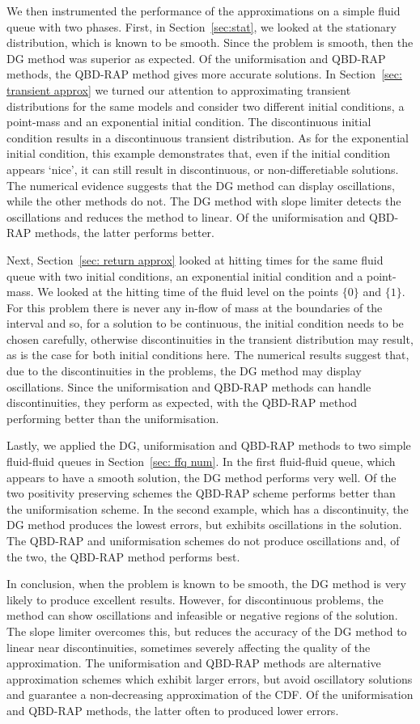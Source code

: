 We then instrumented the performance of the approximations on a simple fluid queue with two phases. First, in Section~\ref{sec:stat}, we looked at the stationary distribution, which is known to be smooth. Since the problem is smooth, then the DG method was superior as expected. Of the uniformisation and QBD-RAP methods, the QBD-RAP method gives more accurate solutions. In Section~\ref{sec: transient approx} we turned our attention to approximating transient distributions for the same models and consider two different initial conditions, a point-mass and an exponential initial condition. The discontinuous initial condition results in a discontinuous transient distribution. As for the exponential initial condition, this example demonstrates that, even if the initial condition appears `nice', it can still result in discontinuous, or non-differetiable solutions. The numerical evidence suggests that the DG method can display oscillations, while the other methods do not. The DG method with slope limiter detects the oscillations and reduces the method to linear. Of the uniformisation and QBD-RAP methods, the latter performs better. 

Next, Section~\ref{sec: return approx} looked at hitting times for the same fluid queue with two initial conditions, an exponential initial condition and a point-mass. We looked at the hitting time of the fluid level on the points \(\{0\}\) and \(\{1\}\). For this problem there is never any in-flow of mass at the boundaries of the interval and so, for a solution to be continuous, the initial condition needs to be chosen carefully, otherwise discontinuities in the transient distribution may result, as is the case for both initial conditions here. The numerical results suggest that, due to the discontinuities in the problems, the DG method may display oscillations. Since the uniformisation and QBD-RAP methods can handle discontinuities, they perform as expected, with the QBD-RAP method performing better than the uniformisation. 

Lastly, we applied the DG, uniformisation and QBD-RAP methods to two simple fluid-fluid queues in Section~\ref{sec: ffq num}. In the first fluid-fluid queue, which appears to have a smooth solution, the DG method performs very well. Of the two positivity preserving schemes the QBD-RAP scheme performs better than the uniformisation scheme. In the second example, which has a discontinuity, the DG method produces the lowest errors, but exhibits oscillations in the solution. The QBD-RAP and uniformisation schemes do not produce oscillations and, of the two, the QBD-RAP method performs best. 

In conclusion, when the problem is known to be smooth, the DG method is very likely to produce excellent results. However, for discontinuous problems, the method can show oscillations and infeasible or negative regions of the solution. The slope limiter overcomes this, but reduces the accuracy of the DG method to linear near discontinuities, sometimes severely affecting the quality of the approximation. The uniformisation and QBD-RAP methods are alternative approximation schemes which exhibit larger errors, but avoid oscillatory solutions and guarantee a non-decreasing approximation of the CDF. Of the uniformisation and QBD-RAP methods, the latter often to produced lower errors. 
